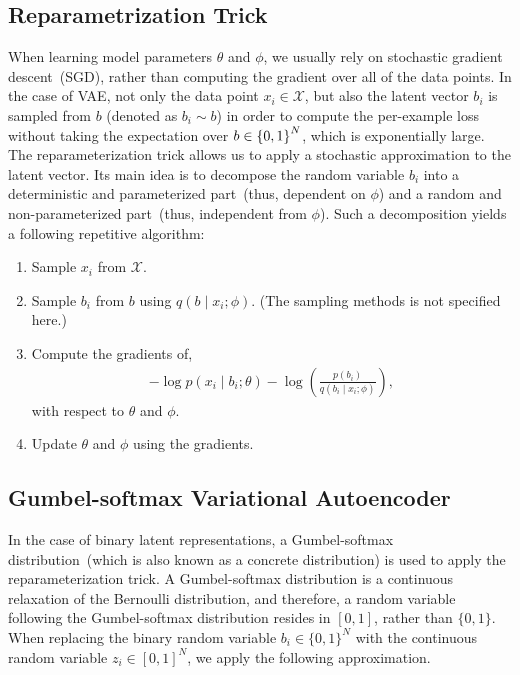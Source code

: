 \documentclass[10pt,letterpaper]{article}
\begin{document}
\subsection{Reparametrization Trick}
When learning model parameters $\theta$ and $\phi$, we usually rely on stochastic gradient descent~(SGD), rather than computing the gradient over all of the data points.
In the case of VAE, not only the data point $x_i\in \mathcal{X}$, but also the latent vector $b_i$ is sampled from $b$ (denoted as $b_i\sim b$) in order to compute the per-example loss without taking the expectation over $b \in {\left\{0,1\right\}}^N$, which is exponentially large.
The reparameterization trick allows us to apply a stochastic approximation to the latent vector.
Its main idea is to decompose the random variable $b_i$ into a deterministic and parameterized part~(thus, dependent on $\phi$) and a random and non-parameterized part~(thus, independent from $\phi$).
Such a decomposition yields a following repetitive algorithm:
\begin{enumerate}
 \item Sample $x_i$ from $\mathcal{X}$.
\item Sample $b_i$ from $b$ using $q(b \mid x_i ;\phi)$. (The sampling methods is not specified here.)
 \item Compute the gradients of,
       \begin{align}
	\label{eq:stochastic-approx}
	-\log p(x_i \mid b_i;\theta) - \log\left(\frac{p(b_i)}{q(b_i \mid x_i;\phi)}\right),
       \end{align}
       with respect to $\theta$ and $\phi$.
 \item Update $\theta$ and $\phi$ using the gradients.
\end{enumerate}

\subsection{Gumbel-softmax Variational Autoencoder}
In the case of binary latent representations, a Gumbel-softmax distribution~(which is also known as a concrete distribution) is used to apply the reparameterization trick.
A Gumbel-softmax distribution is a continuous relaxation of the Bernoulli distribution, and therefore,
a random variable following the Gumbel-softmax distribution resides in $[0,1]$, rather than $\{0,1\}$.
When replacing the binary random variable $b_i\in\{0,1\}^N$ with the continuous random variable $z_i\in[0,1]^N$, we apply the following approximation.
\end{document}
